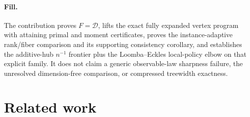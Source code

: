\documentclass{article}
\begin{document}
\paragraph{Fill.} The contribution proves \(F=\mathcal D\), lifts the exact fully expanded vertex program with attaining primal and moment certificates, proves the instance-adaptive rank/fiber comparison and its supporting consistency corollary, and establishes the additive-hub \(n^{-1}\) frontier plus the Loomba--Eckles local-policy elbow on that explicit family. It does not claim a generic observable-law sharpness failure, the unresolved dimension-free comparison, or compressed treewidth exactness.

\section{Related work}
\end{document}

